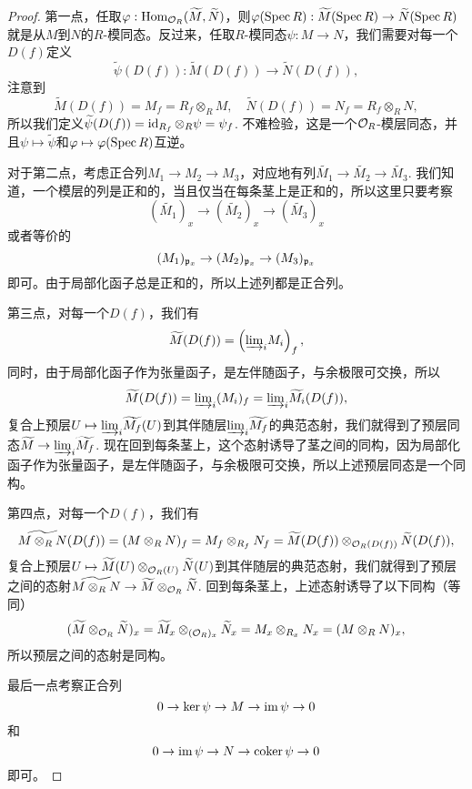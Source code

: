 \begin{proof}
第一点，任取$\varphi:\operatorname{Hom}_{\mathcal{O}_R}(\widetilde{M},\widetilde{N})$，则$\varphi(\operatorname{Spec} R):\widetilde{M}(\operatorname{Spec} R)\to \widetilde{N}(\operatorname{Spec} R)$就是从$M$到$N$的$R$-模同态。反过来，任取$R$-模同态$\psi:M\to N$，我们需要对每一个$D(f)$定义
\[
	\widetilde{\psi}(D(f)):\widetilde{M}(D(f))\to \widetilde{N}(D(f)),
\]
注意到
\[
	\widetilde{M}(D(f))=M_f=R_f\otimes_R M,\quad \widetilde{N}(D(f))=N_f=R_f\otimes_R N,
\]
所以我们定义$\widetilde{\psi}(D(f))=\operatorname{id}_{R_f}\otimes_R \psi=\psi_f$. 不难检验，这是一个$\mathcal{O}_R$-模层同态，并且$\psi\mapsto \widetilde{\psi}$和$\varphi\mapsto \varphi(\operatorname{Spec} R)$互逆。

对于第二点，考虑正合列$M_1\to M_2\to M_3$，对应地有列$\widetilde{M_1}\to \widetilde{M_2}\to \widetilde{M_3}$. 我们知道，一个模层的列是正和的，当且仅当在每条茎上是正和的，所以这里只要考察
\[
	\left(\widetilde{M_1}\right)_x\to \left(\widetilde{M_2}\right)_x\to \left(\widetilde{M_3}\right)_x
\]
或者等价的
\[
	(M_1)_{\mathfrak{p}_x}\to (M_2)_{\mathfrak{p}_x}\to (M_3)_{\mathfrak{p}_x}
\]
即可。由于局部化函子总是正和的，所以上述列都是正合列。

第三点，对每一个$D(f)$，我们有
\[
	\widetilde{M}(D(f))=\left({\varinjlim}_{i}M_i\right)_f,
\]
同时，由于局部化函子作为张量函子，是左伴随函子，与余极限可交换，所以
\[
	\widetilde{M}(D(f))={\varinjlim}_{i}(M_i)_f={\varinjlim}_{i}\widetilde{M_i}(D(f)),
\]
复合上预层$U\mapsto {\varinjlim}_{i}\widetilde{M_f}(U)$到其伴随层${\varinjlim}_{i}\widetilde{M_f}$的典范态射，我们就得到了预层同态$\widetilde{M}\to {\varinjlim}_{i}\widetilde{M_f}$. 现在回到每条茎上，这个态射诱导了茎之间的同构，因为局部化函子作为张量函子，是左伴随函子，与余极限可交换，所以上述预层同态是一个同构。

第四点，对每一个$D(f)$，我们有
\[
	\widetilde{M\otimes_R N}(D(f))=(M\otimes_R N)_f=M_f\otimes_{R_f}N_f=\widetilde{M}(D(f))\otimes_{\mathcal{O}_R(D(f))}\widetilde{N}(D(f)),
\]
复合上预层$U\mapsto \widetilde{M}(U)\otimes_{\mathcal{O}_R(U)}\widetilde{N}(U)$到其伴随层的典范态射，我们就得到了预层之间的态射$\widetilde{M\otimes_R N}\to \widetilde{M}\otimes_{\mathcal{O}_R}\widetilde{N}$. 回到每条茎上，上述态射诱导了以下同构（等同）
\[
	(\widetilde{M}\otimes_{\mathcal{O}_R}\widetilde{N})_x=\widetilde{M}_x\otimes_{(\mathcal{O}_R)_x}\widetilde{N}_x=M_{x}\otimes_{R_x}N_x=(M\otimes_R N)_x,
\]
所以预层之间的态射是同构。

最后一点考察正合列
\[
	0\to \ker \psi \to M \to \operatorname{im} \psi\to 0
\]
和
\[
	0\to \operatorname{im} \psi \to N \to \operatorname{coker} \psi\to 0
\]
即可。
\end{proof}


